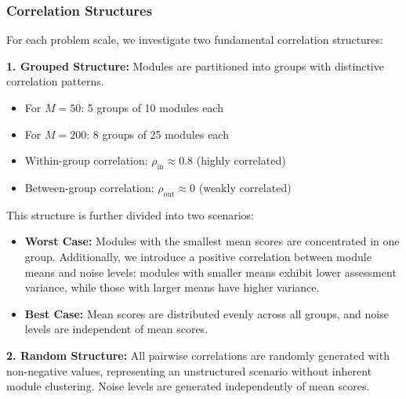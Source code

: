 \documentclass[opre,sglanonrev]{informs4}
\begin{document}
\subsubsection{Correlation Structures}
For each problem scale, we investigate two fundamental correlation structures:

\textbf{1. Grouped Structure:} Modules are partitioned into groups with distinctive correlation patterns.
\begin{itemize}
    \item For $M=50$: 5 groups of 10 modules each
    \item For $M=200$: 8 groups of 25 modules each
    \item Within-group correlation: $\rho_{\text{in}} \approx 0.8$ (highly correlated)
    \item Between-group correlation: $\rho_{\text{out}} \approx 0$ (weakly correlated)
\end{itemize}

This structure is further divided into two scenarios:
\begin{itemize}
    \item \textbf{Worst Case:} Modules with the smallest mean scores are concentrated in one group. Additionally, we introduce a positive correlation between module means and noise levels: modules with smaller means exhibit lower assessment variance, while those with larger means have higher variance.
    \item \textbf{Best Case:} Mean scores are distributed evenly across all groups, and noise levels are independent of mean scores.
\end{itemize}

\textbf{2. Random Structure:} All pairwise correlations are randomly generated with non-negative values, representing an unstructured scenario without inherent module clustering. Noise levels are generated independently of mean scores.
\end{document}
